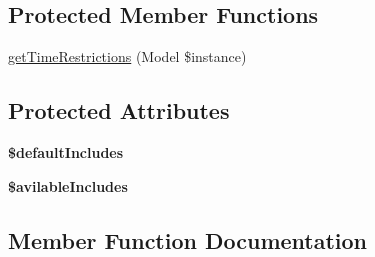 \subsection*{Protected Member Functions}
\begin{DoxyCompactItemize}
\item 
\hyperlink{classDMA_1_1Friends_1_1API_1_1Transformers_1_1ActivityTransformer_a4dac5dd24b8cd6a126943c4e1c1e788b}{get\+Time\+Restrictions} (Model \$instance)
\end{DoxyCompactItemize}
\subsection*{Protected Attributes}
\begin{DoxyCompactItemize}
\item 
{\bfseries \$default\+Includes}
\item 
{\bfseries \$avilable\+Includes}
\end{DoxyCompactItemize}


\subsection{Member Function Documentation}
\hypertarget{classDMA_1_1Friends_1_1API_1_1Transformers_1_1ActivityTransformer_a0de84700162b94dc38fd224057f8a858}{}
